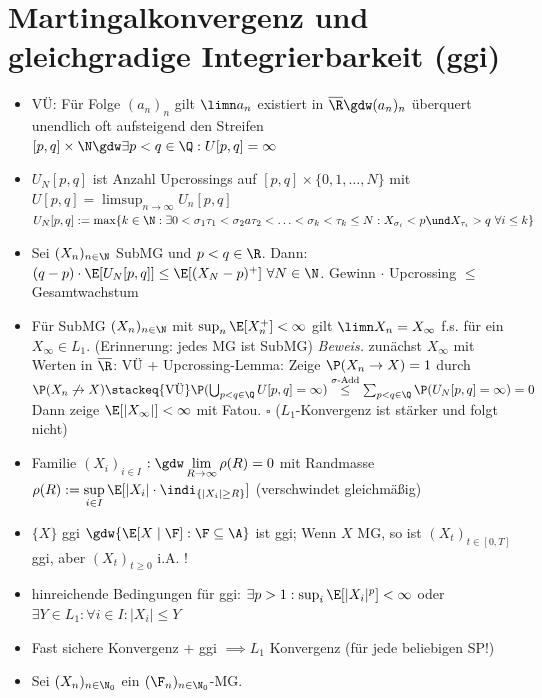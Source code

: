 	\section{Martingalkonvergenz und gleichgradige Integrierbarkeit (ggi)}
	\begin{itemize}
		\item VÜ: Für Folge $(a_n)_n$ gilt $\limn a_n$ existiert  in $\overline{\R}\gdw(a_n)_n$ überquert unendlich oft aufsteigend den Streifen $[p,q]\times\N\gdw\exists p<q\in\Q:U[p,q]=\infty$
		\item $U_N[p,q]$ ist Anzahl Upcrossings auf $[p,q]\times\lbrace0,1,\ldots,N\rbrace$ mit $U[p,q]=\limsup_{n\to\infty} U_n[p,q]$\\
		$U_N[p,q]:=\max\lbrace k\in\N:\exists 0<\sigma_1\tau_1<\sigma_2a\tau_2<\ldots<\sigma_k<\tau_k\leq N:X_{\sigma_i}<p\und X_{\tau_i}>q~\forall i\leq k\rbrace$
		\item {} Sei $(X_n)_{n\in\N}$ SubMG und $p<q\in\R$. Dann:
		$(q-p)\cdot\E[U_N[p,q]]\leq\E[(X_N-p)^+]~\forall N\in\N$. Gewinn $\cdot$ Upcrossing $\leq$ Gesamtwachstum
		\item {} Für SubMG $(X_n)_{n\in\N}$ mit $\sup_n\E[X_n^+]<\infty$ gilt $\limn X_n=X_\infty$ f.s. für ein $X_\infty\in L_1$. (Erinnerung: jedes MG ist SubMG)
		\textit{Beweis.} zunächst $X_\infty$ mit Werten in $\overline{\R}$: VÜ + Upcrossing-Lemma:
		Zeige $\P(X_n\to X)=1$ durch $\P(X_n\not\to X)\stackeq{\text{VÜ}}\P(\bigcup_{p<q\in\Q}U[p,q]=\infty)\overset{\sigma\text{-Add}}{\leq}\sum_{p<q\in\Q}\P(U_N[p,q]=\infty)=0$
		 Dann zeige $\E[|X_\infty|]<\infty$ mit Fatou. $\square$ ($L_1$-Konvergenz ist stärker und folgt nicht)
		\item Familie $(X_i)_{i\in I}$  $:\gdw\lim\limits_{R\to\infty}\rho(R)=0$ mit Randmasse $\rho(R):=\sup\limits_{i\in I}\E[|X_i|\cdot\indi_{\lbrace|X_i|\geq R\rbrace}]$ (verschwindet gleichmäßig)
		\item $\lbrace X\rbrace$ ggi $\gdw\lbrace\E[X\mid\F]:\F\subseteq\A\rbrace$ ist ggi; Wenn $X$ MG, so ist $(X_t)_{t\in[0,T]}$ ggi, aber $(X_t)_{t\geq0}$ i.A. !
		\item hinreichende Bedingungen für ggi: $\exists p>1:\sup_{i}\E[|X_i|^p]<\infty$ oder $\exists Y\in L_1:\forall i\in I:|X_i|\leq Y$
		\item Fast sichere Konvergenz + ggi $\implies L_1$ Konvergenz (für jede beliebigen SP!)
		\item {} Sei $(X_n)_{n\in\N_0}$ ein $(\F_n)_{n\in\N_0}$-MG. 

\end{itemize}
